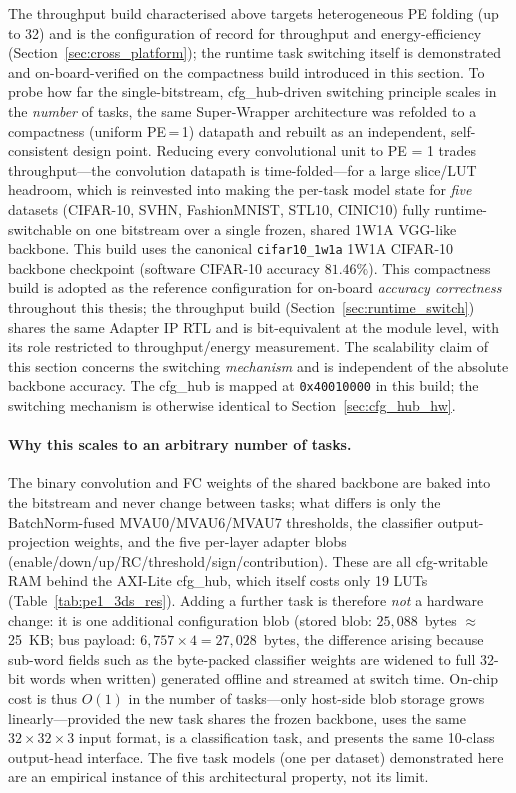 \documentclass[12pt, a4paper]{report}
\numberwithin{equation}{chapter}
\numberwithin{figure}{chapter}
\numberwithin{table}{chapter}
\numberwithin{algorithm}{chapter}
\begin{document}
The throughput build characterised above targets heterogeneous PE folding (up to 32) and is the configuration of record for throughput and energy-efficiency (Section~\ref{sec:cross_platform}); the runtime task switching itself is demonstrated and on-board-verified on the compactness build introduced in this section. To probe how far the single-bitstream, cfg\_hub-driven switching principle scales in the \emph{number} of tasks, the same Super-Wrapper architecture was refolded to a compactness (uniform PE\,=\,1) datapath and rebuilt as an independent, self-consistent design point. Reducing every convolutional unit to PE = 1 trades throughput---the convolution datapath is time-folded---for a large slice/LUT headroom, which is reinvested into making the per-task model state for \emph{five} datasets (CIFAR-10, SVHN, FashionMNIST, STL10, CINIC10) fully runtime-switchable on one bitstream over a single frozen, shared 1W1A VGG-like backbone. This build uses the canonical \texttt{cifar10\_1w1a} 1W1A CIFAR-10 backbone checkpoint (software CIFAR-10 accuracy $81.46\%$). This compactness build is adopted as the reference configuration for on-board \emph{accuracy correctness} throughout this thesis; the throughput build (Section~\ref{sec:runtime_switch}) shares the same Adapter IP RTL and is bit-equivalent at the module level, with its role restricted to throughput/energy measurement. The scalability claim of this section concerns the switching \emph{mechanism} and is independent of the absolute backbone accuracy. The cfg\_hub is mapped at \texttt{0x40010000} in this build; the switching mechanism is otherwise identical to Section~\ref{sec:cfg_hub_hw}.

\paragraph{Why this scales to an arbitrary number of tasks.}
The binary convolution and FC weights of the shared backbone are baked into the bitstream and never change between tasks; what differs is only the BatchNorm-fused MVAU0/MVAU6/MVAU7 thresholds, the classifier output-projection weights, and the five per-layer adapter blobs (enable/down/up/RC/threshold/sign/contribution). These are all cfg-writable RAM behind the AXI-Lite cfg\_hub, which itself costs only 19 LUTs (Table~\ref{tab:pe1_3ds_res}). Adding a further task is therefore \emph{not} a hardware change: it is one additional configuration blob (stored blob: $25{,}088$~bytes $\approx$25~KB; bus payload: $6{,}757 \times 4 = 27{,}028$~bytes, the difference arising because sub-word fields such as the byte-packed classifier weights are widened to full 32-bit words when written) generated offline and streamed at switch time. On-chip cost is thus $O(1)$ in the number of tasks---only host-side blob storage grows linearly---provided the new task shares the frozen backbone, uses the same $32\times32\times3$ input format, is a classification task, and presents the same 10-class output-head interface. The five task models (one per dataset) demonstrated here are an empirical instance of this architectural property, not its limit.
\end{document}
